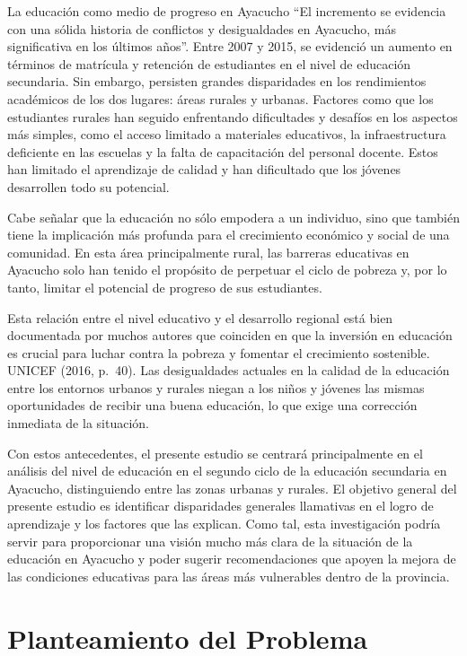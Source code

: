\documentclass[
]{article}
\begin{document}
La educación como medio de progreso en Ayacucho ``El incremento se
evidencia con una sólida historia de conflictos y desigualdades en
Ayacucho, más significativa en los últimos años''. Entre 2007 y 2015, se
evidenció un aumento en términos de matrícula y retención de estudiantes
en el nivel de educación secundaria. Sin embargo, persisten grandes
disparidades en los rendimientos académicos de los dos lugares: áreas
rurales y urbanas. Factores como que los estudiantes rurales han seguido
enfrentando dificultades y desafíos en los aspectos más simples, como el
acceso limitado a materiales educativos, la infraestructura deficiente
en las escuelas y la falta de capacitación del personal docente. Estos
han limitado el aprendizaje de calidad y han dificultado que los jóvenes
desarrollen todo su potencial.

Cabe señalar que la educación no sólo empodera a un individuo, sino que
también tiene la implicación más profunda para el crecimiento económico
y social de una comunidad. En esta área principalmente rural, las
barreras educativas en Ayacucho solo han tenido el propósito de
perpetuar el ciclo de pobreza y, por lo tanto, limitar el potencial de
progreso de sus estudiantes.

Esta relación entre el nivel educativo y el desarrollo regional está
bien documentada por muchos autores que coinciden en que la inversión en
educación es crucial para luchar contra la pobreza y fomentar el
crecimiento sostenible. UNICEF (2016, p.~40). Las desigualdades actuales
en la calidad de la educación entre los entornos urbanos y rurales
niegan a los niños y jóvenes las mismas oportunidades de recibir una
buena educación, lo que exige una corrección inmediata de la situación.

Con estos antecedentes, el presente estudio se centrará principalmente
en el análisis del nivel de educación en el segundo ciclo de la
educación secundaria en Ayacucho, distinguiendo entre las zonas urbanas
y rurales. El objetivo general del presente estudio es identificar
disparidades generales llamativas en el logro de aprendizaje y los
factores que las explican. Como tal, esta investigación podría servir
para proporcionar una visión mucho más clara de la situación de la
educación en Ayacucho y poder sugerir recomendaciones que apoyen la
mejora de las condiciones educativas para las áreas más vulnerables
dentro de la provincia.

\newpage

\section*{Planteamiento del Problema}\label{planteamiento-del-problema}
\end{document}
